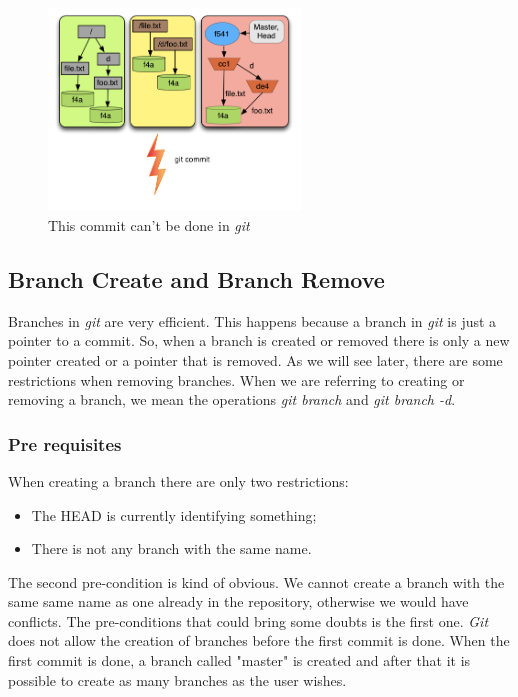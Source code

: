 \begin{figure}[!t]
   \centering
   \includegraphics[width=0.6\textwidth]{images/commit_pre.png}
   \caption{This commit can't be done in \emph{git}}\label{fig:commit_pre}
\end{figure}

\subsection{Branch Create and Branch Remove}
Branches in \emph{git} are very efficient. This happens because a
branch in \emph{git} is just a pointer to a commit. So, when a branch
is created or removed there is only a new pointer created or a
pointer that is removed. As we will see later, there are some
restrictions when removing branches. When we are referring to
creating or removing a branch, we mean the operations
\emph{git branch} and \emph{git branch -d}.

\subsubsection{Pre requisites}
When creating a branch there are only two restrictions:
\begin{itemize}
   \item The HEAD is currently identifying something;
   \item There is not any branch with the same name.
\end{itemize}
The second pre-condition is kind of obvious. We cannot create a branch
with the same same name as one already in the repository, otherwise we
would have conflicts. The pre-conditions that could bring some doubts
is the first one. \emph{Git} does not allow the creation of branches
before the first commit is done. When the first commit is done, a
branch called "master" is created and after that it is possible to
create as many branches as the user wishes.\\

